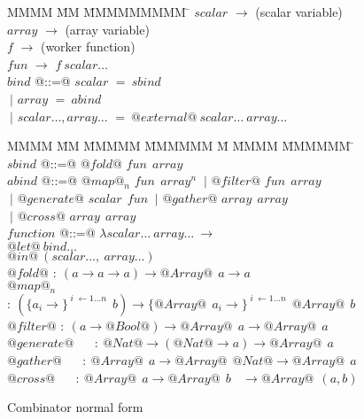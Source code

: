 \begin{figure}
\begin{tabbing}
MMMM        \= MM \= MMMMMMMMM \= \kill
$scalar$    \> $\to$ \> (scalar variable) \\
$array$     \> $\to$ \> (array variable)  \\
$f$         \> $\to$ \> (worker function) \\
$fun$       \> $\to$ \> $f~scalar\ldots$
\\[2ex]
$bind$      \> @::=@ \> $scalar$ \> $=~sbind$ \\
            \> $~|$  \> $array$  \> $=~abind$ \\
            \> $~|$  \> $scalar\ldots,array\ldots$ \> $=~@external@~scalar\ldots~array\ldots$
\end{tabbing}

\begin{tabbing}
MMMM        \= MM \= MMMMM \= MMMMMM \= M \= MMMM \= MMMMMM \= \kill
$sbind$     \> @::=@ \> $@fold@$     \> $fun~~ array$
\\[1ex]

$abind$     \> @::=@ \> $@map@_n$    \> $fun~~ array^n$ 
            \> $~|$  \> $@filter@$   \> $fun~~ array$   \\
            \> $~|$  \> $@generate@$ \> $scalar~~ fun$  
            \> $~|$  \> $@gather@$   \> $array~~ array$ \\
            \> $~|$  \> $@cross@$    \> $array~~ array$
\\[1ex]
$function$  \> @::=@ \> $\lambda scalar\ldots~array\ldots~\to$ \\
            \>          \> $@let@~bind\ldots$                  \\
            \>          \> $@in@~(scalar\ldots,~array\ldots)$
\\[3ex]
$@fold@$     \> $:~ (a \to a \to a) \to @Array@~~ a \to a$     \\
$@map@_n$    \> $:~ (\{a_i          \to\}^{\;i\; \gets 1 \dots n}~~ b)  \to
                       \{@Array@~~ a_i \to\}^{\;i\; \gets 1 \dots n}~~ @Array@~~ b$ \\
$@filter@$   \> $:~ (a \to @Bool@) \to @Array@~~ a \to @Array@~~ a$      \\
$@generate@$ \> ~~ $:~ @Nat@ \to (@Nat@ \to a) \to @Array@~~ a$          \\
$@gather@$   \> ~~ $:~ @Array@~~ a \to @Array@~~ @Nat@  \to @Array@~~ a$ \\
$@cross@$    \> ~~ $:~ @Array@~~ a \to @Array@~~ b ~~~~ \to @Array@~~ (a, b)$
\end{tabbing}
\caption{Combinator normal form}
\label{f:CombinatorNormalForm}
\end{figure}

